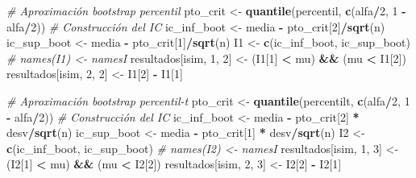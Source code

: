 \documentclass[]{book}
\newenvironment{Shaded}{\begin{snugshade}}{\end{snugshade}}
\newcommand{\KeywordTok}[1]{\textcolor[rgb]{0.13,0.29,0.53}{\textbf{#1}}}
\newcommand{\DecValTok}[1]{\textcolor[rgb]{0.00,0.00,0.81}{#1}}
\newcommand{\StringTok}[1]{\textcolor[rgb]{0.31,0.60,0.02}{#1}}
\newcommand{\CommentTok}[1]{\textcolor[rgb]{0.56,0.35,0.01}{\textit{#1}}}
\newcommand{\OperatorTok}[1]{\textcolor[rgb]{0.81,0.36,0.00}{\textbf{#1}}}
\newcommand{\NormalTok}[1]{#1}
\theoremstyle{definition}
\theoremstyle{definition}
\theoremstyle{definition}
\theoremstyle{remark}
\begin{document}
\begin{Shaded}
\begin{Highlighting}[]
{    \CommentTok{# Aproximación bootstrap percentil}
\NormalTok{    pto_crit <-}\StringTok{ }\KeywordTok{quantile}\NormalTok{(percentil, }\KeywordTok{c}\NormalTok{(alfa}\OperatorTok{/}\DecValTok{2}\NormalTok{, }\DecValTok{1} \OperatorTok{-}\StringTok{ }\NormalTok{alfa}\OperatorTok{/}\DecValTok{2}\NormalTok{))}
    \CommentTok{# Construcción del IC}
\NormalTok{    ic_inf_boot <-}\StringTok{ }\NormalTok{media }\OperatorTok{-}\StringTok{ }\NormalTok{pto_crit[}\DecValTok{2}\NormalTok{]}\OperatorTok{/}\KeywordTok{sqrt}\NormalTok{(n)}
\NormalTok{    ic_sup_boot <-}\StringTok{ }\NormalTok{media }\OperatorTok{-}\StringTok{ }\NormalTok{pto_crit[}\DecValTok{1}\NormalTok{]}\OperatorTok{/}\KeywordTok{sqrt}\NormalTok{(n)}
\NormalTok{    I1 <-}\StringTok{ }\KeywordTok{c}\NormalTok{(ic_inf_boot, ic_sup_boot)}
    \CommentTok{# names(I1) <- namesI}
\NormalTok{    resultados[isim, }\DecValTok{1}\NormalTok{, }\DecValTok{2}\NormalTok{] <-}\StringTok{ }\NormalTok{(I1[}\DecValTok{1}\NormalTok{] }\OperatorTok{<}\StringTok{ }\NormalTok{mu) }\OperatorTok{&&}\StringTok{ }\NormalTok{(mu }\OperatorTok{<}\StringTok{ }\NormalTok{I1[}\DecValTok{2}\NormalTok{])}
\NormalTok{    resultados[isim, }\DecValTok{2}\NormalTok{, }\DecValTok{2}\NormalTok{] <-}\StringTok{ }\NormalTok{I1[}\DecValTok{2}\NormalTok{] }\OperatorTok{-}\StringTok{ }\NormalTok{I1[}\DecValTok{1}\NormalTok{]}
    
    \CommentTok{# Aproximación bootstrap percentil-t}
\NormalTok{    pto_crit <-}\StringTok{ }\KeywordTok{quantile}\NormalTok{(percentilt, }\KeywordTok{c}\NormalTok{(alfa}\OperatorTok{/}\DecValTok{2}\NormalTok{, }\DecValTok{1} \OperatorTok{-}\StringTok{ }\NormalTok{alfa}\OperatorTok{/}\DecValTok{2}\NormalTok{))}
    \CommentTok{# Construcción del IC}
\NormalTok{    ic_inf_boot <-}\StringTok{ }\NormalTok{media }\OperatorTok{-}\StringTok{ }\NormalTok{pto_crit[}\DecValTok{2}\NormalTok{] }\OperatorTok{*}\StringTok{ }\NormalTok{desv}\OperatorTok{/}\KeywordTok{sqrt}\NormalTok{(n)}
\NormalTok{    ic_sup_boot <-}\StringTok{ }\NormalTok{media }\OperatorTok{-}\StringTok{ }\NormalTok{pto_crit[}\DecValTok{1}\NormalTok{] }\OperatorTok{*}\StringTok{ }\NormalTok{desv}\OperatorTok{/}\KeywordTok{sqrt}\NormalTok{(n)}
\NormalTok{    I2 <-}\StringTok{ }\KeywordTok{c}\NormalTok{(ic_inf_boot, ic_sup_boot)}
    \CommentTok{# names(I2) <- namesI}
\NormalTok{    resultados[isim, }\DecValTok{1}\NormalTok{, }\DecValTok{3}\NormalTok{] <-}\StringTok{ }\NormalTok{(I2[}\DecValTok{1}\NormalTok{] }\OperatorTok{<}\StringTok{ }\NormalTok{mu) }\OperatorTok{&&}\StringTok{ }\NormalTok{(mu }\OperatorTok{<}\StringTok{ }\NormalTok{I2[}\DecValTok{2}\NormalTok{])}
\NormalTok{    resultados[isim, }\DecValTok{2}\NormalTok{, }\DecValTok{3}\NormalTok{] <-}\StringTok{ }\NormalTok{I2[}\DecValTok{2}\NormalTok{] }\OperatorTok{-}\StringTok{ }\NormalTok{I2[}\DecValTok{1}\NormalTok{]}
    
}
\end{Highlighting}
\end{Shaded}
\end{document}
